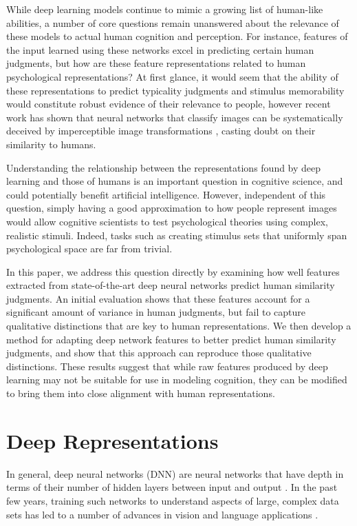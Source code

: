 \documentclass[10pt,letterpaper]{article}
\begin{document}
While deep learning models continue to mimic a growing list of human-like abilities, a number of core questions remain unanswered about the relevance of these models to actual human cognition and perception. For instance, features of the input learned using these networks excel in predicting certain human judgments, but how are these feature representations related to human psychological representations? At first glance, it would seem that the ability of these representations to predict typicality judgments and stimulus memorability would constitute robust evidence of their relevance to people, however recent work has shown that neural networks that classify images can be systematically deceived by imperceptible image transformations \citep*{szegedy2013intriguing}, casting doubt on their similarity to humans.

Understanding the relationship between the representations found by deep learning and those of humans is an important question in cognitive science, and could potentially benefit artificial intelligence. However, independent of this question, simply having a good approximation to how people represent images would allow cognitive scientists to test psychological theories using complex, realistic stimuli. Indeed, tasks such as creating stimulus sets that uniformly span psychological space are far from trivial.

In this paper, we address this question directly by examining how well features extracted from state-of-the-art deep neural networks predict human similarity judgments. An initial evaluation shows that these features account for a significant amount of variance in human judgments, but fail to capture qualitative distinctions that are key to human representations. We then develop a method for adapting deep network features to better predict human similarity judgments, and show that this approach can reproduce those qualitative distinctions. These results suggest that while raw features produced by deep learning may not be suitable for use in modeling cognition, they can be modified to bring them into close alignment with human representations.

\section{Deep Representations}
In general, deep neural networks (DNN) are neural networks that have depth in terms of their number of hidden layers between input and output \citep*{bengio2009learning}. In the past few years, training such networks to understand aspects of large, complex data sets has led to a number of advances in vision and language applications \citep*{lecun2015deep}.
\end{document}
